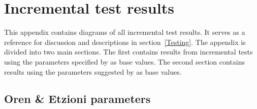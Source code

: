 
\chapter{Incremental test results} %

\label{AppendixA} %


This appendix contains diagrams of all incremental test results. It serves as a reference for discussion and descriptions in section~\ref{Testing}. The appendix is divided into two main sections. The first contains results from incremental tests using the parameters specified by \cite{Oren1998} as base values. The second section contains results using the parameters suggested by \supervisor as base values.

\section{Oren \& Etzioni parameters}

%

